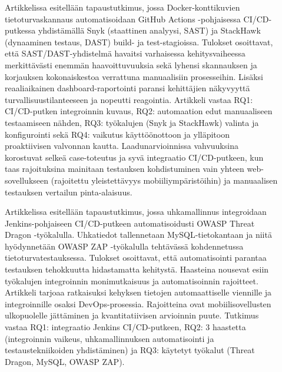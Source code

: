 \documentclass[bscthesis,finnish,oneside,biblatex]{uefcsthesis}
\begin{document}
\begin{description}
    \item[\cite{marandi2023_ias}] Artikkelissa esitellään tapaustutkimus, jossa Docker-konttikuvien tietoturvaskannaus automatisoidaan
    GitHub Actions -pohjaisessa CI/CD-putkessa yhdistämällä Snyk (staattinen analyysi, SAST) ja StackHawk (dynaaminen testaus, DAST)
    build- ja test-stagioissa. Tulokset osoittavat, että SAST/DAST-yhdistelmä havaitsi varhaisessa kehitysvaiheessa merkittävästi
    enemmän haavoittuvuuksia sekä lyhensi skannauksen ja korjauksen kokonaiskestoa verrattuna manuaalisiin prosesseihin.
    Lisäksi reaaliaikainen dashboard-raportointi paransi kehittäjien näkyvyyttä turvallisuustilanteeseen ja nopeutti reagointia.
    Artikkeli vastaa RQ1: CI/CD-putken integroinnin kuvaus, RQ2: automaation edut manuaaliseen testaamiseen nähden,
    RQ3: työkalujen (Snyk ja StackHawk) valinta ja konfigurointi sekä RQ4: vaikutus käyttöönottoon ja ylläpitoon proaktiivisen
    valvonnan kautta. Laadunarvioinnissa vahvuuksina korostuvat selkeä case-toteutus ja syvä integraatio CI/CD-putkeen, kun taas
    rajoituksina mainitaan testauksen kohdistuminen vain yhteen web-sovellukseen (rajoitettu yleistettävyys mobiiliympäristöihin)
    ja manuaalisen testauksen vertailun pinta-alaisuus.
\end{description}

\begin{description}
    \item[\cite{nikolov2024_fit}] Artikkelissa esitellään tapaustutkimus, jossa uhkamallinnus integroidaan Jenkins-pohjaiseen CI/CD-putkeen
     automatisoidusti OWASP Threat Dragon -työkalulla. Uhkatiedot tallennetaan MySQL-tietokantaan ja niitä hyödynnetään OWASP ZAP -työkalulla
     tehtävässä kohdennetussa tietoturvatestauksessa. Tulokset osoittavat, että automatisointi parantaa testauksen tehokkuutta hidastamatta
     kehitystä. Haasteina nousevat esiin työkalujen integroinnin monimutkaisuus ja automatisoinnin rajoitteet. Artikkeli tarjoaa ratkaisuksi
     kehyksen tietojen automaattiselle viennille ja integroinnille osaksi DevOps-prosessia. Rajoitteina ovat mobiilisovellusten ulkopuolelle
     jättäminen ja kvantitatiivisen arvioinnin puute. Tutkimus vastaa RQ1: integraatio Jenkins CI/CD-putkeen, RQ2: 3 haastetta (integroinnin
     vaikeus, uhkamallinnuksen automatisointi ja testaustekniikoiden yhdistäminen) ja RQ3: käytetyt työkalut (Threat Dragon, MySQL, OWASP ZAP).

\end{description}
\end{document}
